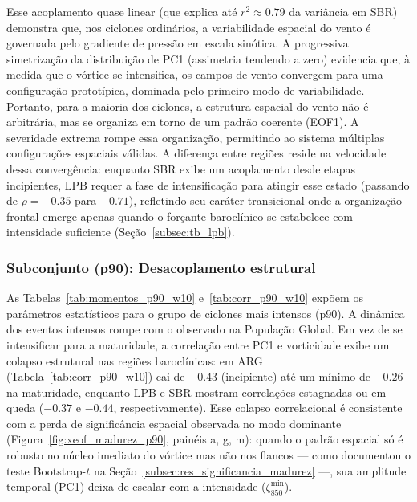 Esse acoplamento quase linear (que explica até $r^2 \approx 0.79$ da variância em SBR) demonstra que, nos ciclones ordinários, a variabilidade espacial do vento é governada pelo gradiente de pressão em escala sinótica.
A progressiva simetrização da distribuição de PC1 (assimetria tendendo a zero) evidencia que, à medida que o vórtice se intensifica, os campos de vento convergem para uma configuração prototípica, dominada pelo primeiro modo de variabilidade.
Portanto, para a maioria dos ciclones, a estrutura espacial do vento não é arbitrária, mas se organiza em torno de um padrão coerente (EOF1).
A severidade extrema rompe essa organização, permitindo ao sistema múltiplas configurações espaciais válidas.
A diferença entre regiões reside na velocidade dessa convergência: enquanto SBR exibe um acoplamento desde etapas incipientes, LPB requer a fase de intensificação para atingir esse estado (passando de $\rho = -0.35$ para $-0.71$), refletindo seu caráter transicional onde a organização frontal emerge apenas quando o forçante baroclínico se estabelece com intensidade suficiente (Seção~\ref{subsec:tb_lpb}).

\subsubsection{Subconjunto (p90): Desacoplamento estrutural}

As Tabelas~\ref{tab:momentos_p90_w10} e~\ref{tab:corr_p90_w10} expõem os parâmetros estatísticos para o grupo de ciclones mais intensos (p90).
A dinâmica dos eventos intensos rompe com o observado na População Global.
Em vez de se intensificar para a maturidade, a correlação entre PC1 e vorticidade exibe um colapso estrutural nas regiões baroclínicas: em ARG (Tabela~\ref{tab:corr_p90_w10}) cai de $-0.43$ (incipiente) até um mínimo de $-0.26$ na maturidade, enquanto LPB e SBR mostram correlações estagnadas ou em queda ($-0.37$ e $-0.44$, respectivamente).
Esse colapso correlacional é consistente com a perda de significância espacial observada no modo dominante (Figura~\ref{fig:xeof_madurez_p90}, painéis a, g, m): quando o padrão espacial só é robusto no núcleo imediato do vórtice mas não nos flancos --- como documentou o teste Bootstrap-$t$ na Seção~\ref{subsec:res_significancia_madurez} ---, sua amplitude temporal (PC1) deixa de escalar com a intensidade ($\zeta_{850}^{\min}$).



